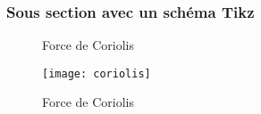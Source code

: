 \blindtext[2]

\subsubsection{Sous section avec un schéma Tikz}

\blindtext[5]
\begin{figure}[ht]
    \centering
    
    \caption{Force de Coriolis}%
    \label{fig:coriolis}
\end{figure}

\begin{figure}[ht]
    \centering
    \texttt{[image: coriolis]}
    \caption{Force de Coriolis}%
    \label{fig:coriolisbis}
\end{figure}

